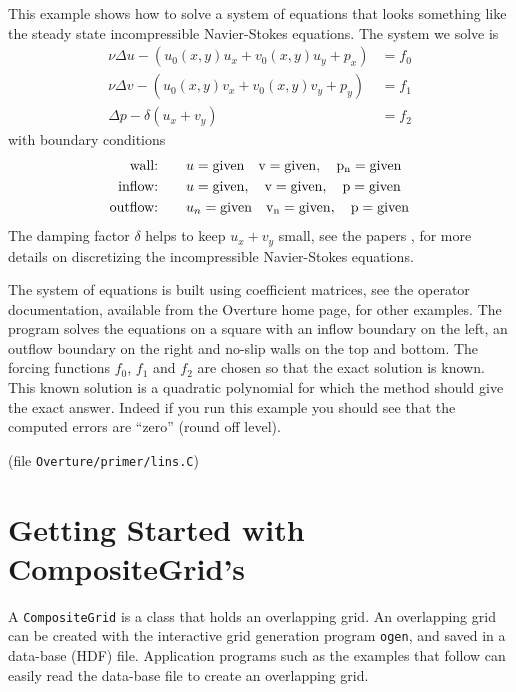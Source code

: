 \documentclass{article}
\begin{document}
This example shows how to solve a system of equations that looks something like
the steady state incompressible Navier-Stokes equations. The system we solve is
\begin{align*}
  \nu \Delta u -( u_0(x,y) u_x + v_0(x,y) u_y  + p_x ) &= f_0 \\
  \nu \Delta v -( u_0(x,y) v_x + v_0(x,y) v_y  + p_y ) &= f_1 \\
  \Delta p - \delta (u_x+v_y)                      &= f_2 
\end{align*}
with boundary conditions
\newcommand{\given}{\rm given}
\begin{align*}
   \text{wall:}&\qquad u=\given \quad v=\given, \quad p_n=\given \\
   \text{inflow:}&\qquad u=\given, \quad v=\given, \quad p=\given \\
   \text{outflow:}&\qquad u_n=\given \quad v_n=\given, \quad p=\given
\end{align*}
The damping factor $\delta$ helps to keep $u_x+v_y$ small, see the papers
 \cite{ICSSI},\cite{BCSSI} for more details on discretizing the incompressible
Navier-Stokes equations.

The system of equations is built using coefficient matrices, see the operator
documentation, available from the Overture home page, for other examples.
The program solves the equations on a square with an inflow boundary on the left,
an outflow boundary on the right and no-slip walls on the top and bottom.
The forcing functions $f_0$, $f_1$ and $f_2$ are chosen so that the exact solution
is known. This known solution is a quadratic polynomial for which the method should
give the exact answer. Indeed if you run this example you should see that the
computed errors are ``zero'' (round off level).



(file {\tt Overture/primer/lins.C})
{\footnotesize
{}
}




\vfill\eject
\section{Getting Started with CompositeGrid's}

A {\tt CompositeGrid} is a class that holds an overlapping grid. An
overlapping grid can be created with the interactive grid generation program
{\tt ogen}, and saved in a data-base (HDF) file. Application programs such
as the examples that follow can easily read the data-base file to create 
an overlapping grid.
\end{document}
